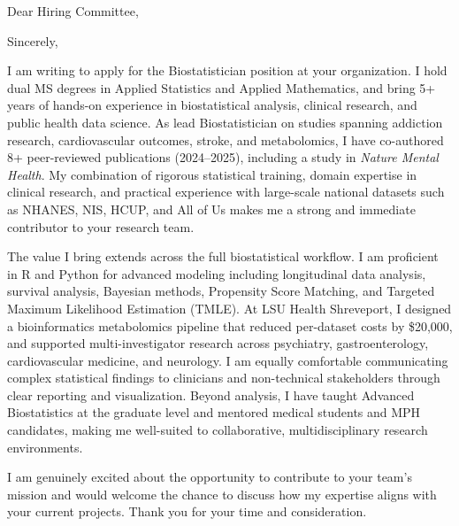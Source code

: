 \documentclass[11pt,a4paper,roman]{moderncv}
\begin{document}
\opening{Dear Hiring Committee,}
\closing{Sincerely,}
\makelettertitle

I am writing to apply for the Biostatistician position at your organization. I hold dual MS degrees in Applied Statistics and Applied Mathematics, and bring 5+ years of hands-on experience in biostatistical analysis, clinical research, and public health data science. As lead Biostatistician on studies spanning addiction research, cardiovascular outcomes, stroke, and metabolomics, I have co-authored 8+ peer-reviewed publications (2024--2025), including a study in \textit{Nature Mental Health}. My combination of rigorous statistical training, domain expertise in clinical research, and practical experience with large-scale national datasets such as NHANES, NIS, HCUP, and All of Us makes me a strong and immediate contributor to your research team.

The value I bring extends across the full biostatistical workflow. I am proficient in R and Python for advanced modeling including longitudinal data analysis, survival analysis, Bayesian methods, Propensity Score Matching, and Targeted Maximum Likelihood Estimation (TMLE). At LSU Health Shreveport, I designed a bioinformatics metabolomics pipeline that reduced per-dataset costs by \$20,000, and supported multi-investigator research across psychiatry, gastroenterology, cardiovascular medicine, and neurology. I am equally comfortable communicating complex statistical findings to clinicians and non-technical stakeholders through clear reporting and visualization. Beyond analysis, I have taught Advanced Biostatistics at the graduate level and mentored medical students and MPH candidates, making me well-suited to collaborative, multidisciplinary research environments.

I am genuinely excited about the opportunity to contribute to your team's mission and would welcome the chance to discuss how my expertise aligns with your current projects. Thank you for your time and consideration.

\vspace{0.5cm}

\makeletterclosing
\end{document}
